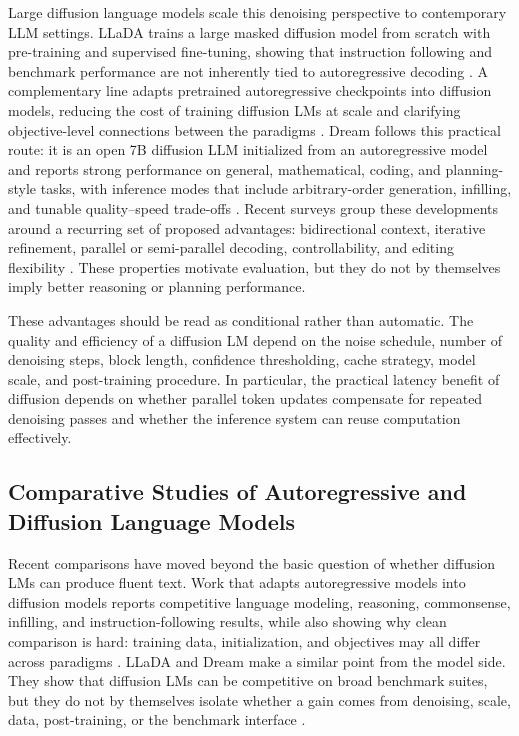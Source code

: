 Large diffusion language models scale this denoising perspective to contemporary LLM settings. LLaDA trains a large masked diffusion model from scratch with pre-training and supervised fine-tuning, showing that instruction following and benchmark performance are not inherently tied to autoregressive decoding \cite{nie2025llada}. A complementary line adapts pretrained autoregressive checkpoints into diffusion models, reducing the cost of training diffusion LMs at scale and clarifying objective-level connections between the paradigms \cite{gong2025scaling}. Dream follows this practical route: it is an open 7B diffusion LLM initialized from an autoregressive model and reports strong performance on general, mathematical, coding, and planning-style tasks, with inference modes that include arbitrary-order generation, infilling, and tunable quality--speed trade-offs \cite{ye2025dream}. Recent surveys group these developments around a recurring set of proposed advantages: bidirectional context, iterative refinement, parallel or semi-parallel decoding, controllability, and editing flexibility \cite{li2025survey,yu2025discrete}. These properties motivate evaluation, but they do not by themselves imply better reasoning or planning performance.

These advantages should be read as conditional rather than automatic. The quality and efficiency of a diffusion LM depend on the noise schedule, number of denoising steps, block length, confidence thresholding, cache strategy, model scale, and post-training procedure. In particular, the practical latency benefit of diffusion depends on whether parallel token updates compensate for repeated denoising passes and whether the inference system can reuse computation effectively.

\subsection{Comparative Studies of Autoregressive and Diffusion Language Models}
Recent comparisons have moved beyond the basic question of whether diffusion
LMs can produce fluent text. Work that adapts autoregressive models into
diffusion models reports competitive language modeling, reasoning, commonsense,
infilling, and instruction-following results, while also showing why clean
comparison is hard: training data, initialization, and objectives may all
differ across paradigms \cite{gong2025scaling}. LLaDA and Dream make a similar
point from the model side. They show that diffusion LMs can be competitive on
broad benchmark suites, but they do not by themselves isolate whether a gain
comes from denoising, scale, data, post-training, or the benchmark interface
\cite{nie2025llada,ye2025dream}.


